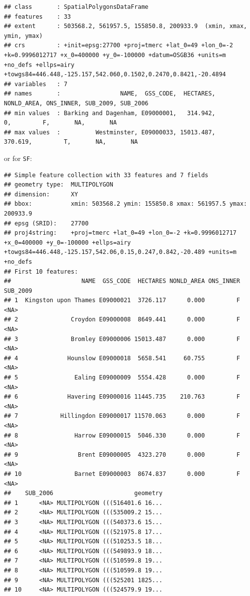 \documentclass[]{book}
\newenvironment{Shaded}{\begin{snugshade}}{\end{snugshade}}
\newcommand{\DecValTok}[1]{\textcolor[rgb]{0.00,0.00,0.81}{#1}}
\newcommand{\KeywordTok}[1]{\textcolor[rgb]{0.13,0.29,0.53}{\textbf{#1}}}
\newcommand{\NormalTok}[1]{#1}
\newcommand{\OperatorTok}[1]{\textcolor[rgb]{0.81,0.36,0.00}{\textbf{#1}}}
\newcommand{\StringTok}[1]{\textcolor[rgb]{0.31,0.60,0.02}{#1}}
\begin{document}
\begin{verbatim}
## class       : SpatialPolygonsDataFrame 
## features    : 33 
## extent      : 503568.2, 561957.5, 155850.8, 200933.9  (xmin, xmax, ymin, ymax)
## crs         : +init=epsg:27700 +proj=tmerc +lat_0=49 +lon_0=-2 +k=0.9996012717 +x_0=400000 +y_0=-100000 +datum=OSGB36 +units=m +no_defs +ellps=airy +towgs84=446.448,-125.157,542.060,0.1502,0.2470,0.8421,-20.4894 
## variables   : 7
## names       :                 NAME,  GSS_CODE,  HECTARES, NONLD_AREA, ONS_INNER, SUB_2009, SUB_2006 
## min values  : Barking and Dagenham, E09000001,   314.942,          0,         F,       NA,       NA 
## max values  :          Westminster, E09000033, 15013.487,    370.619,         T,       NA,       NA
\end{verbatim}

or for \texttt{SF}:

\begin{Shaded}
\end{Shaded}

\begin{verbatim}
## Simple feature collection with 33 features and 7 fields
## geometry type:  MULTIPOLYGON
## dimension:      XY
## bbox:           xmin: 503568.2 ymin: 155850.8 xmax: 561957.5 ymax: 200933.9
## epsg (SRID):    27700
## proj4string:    +proj=tmerc +lat_0=49 +lon_0=-2 +k=0.9996012717 +x_0=400000 +y_0=-100000 +ellps=airy +towgs84=446.448,-125.157,542.06,0.15,0.247,0.842,-20.489 +units=m +no_defs
## First 10 features:
##                    NAME  GSS_CODE  HECTARES NONLD_AREA ONS_INNER SUB_2009
## 1  Kingston upon Thames E09000021  3726.117      0.000         F     <NA>
## 2               Croydon E09000008  8649.441      0.000         F     <NA>
## 3               Bromley E09000006 15013.487      0.000         F     <NA>
## 4              Hounslow E09000018  5658.541     60.755         F     <NA>
## 5                Ealing E09000009  5554.428      0.000         F     <NA>
## 6              Havering E09000016 11445.735    210.763         F     <NA>
## 7            Hillingdon E09000017 11570.063      0.000         F     <NA>
## 8                Harrow E09000015  5046.330      0.000         F     <NA>
## 9                 Brent E09000005  4323.270      0.000         F     <NA>
## 10               Barnet E09000003  8674.837      0.000         F     <NA>
##    SUB_2006                       geometry
## 1      <NA> MULTIPOLYGON (((516401.6 16...
## 2      <NA> MULTIPOLYGON (((535009.2 15...
## 3      <NA> MULTIPOLYGON (((540373.6 15...
## 4      <NA> MULTIPOLYGON (((521975.8 17...
## 5      <NA> MULTIPOLYGON (((510253.5 18...
## 6      <NA> MULTIPOLYGON (((549893.9 18...
## 7      <NA> MULTIPOLYGON (((510599.8 19...
## 8      <NA> MULTIPOLYGON (((510599.8 19...
## 9      <NA> MULTIPOLYGON (((525201 1825...
## 10     <NA> MULTIPOLYGON (((524579.9 19...
\end{verbatim}
\end{document}
